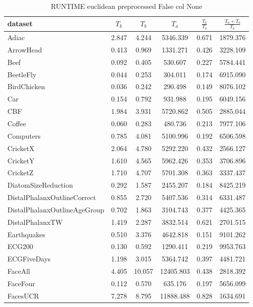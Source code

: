 \begin{table}[ht]
\caption{RUNTIME euclidean preprocessed False col None} 
\begin{adjustbox}{width=0.7\textwidth,center}
\begin{tabular}{lccccc}
\hline
dataset & $T_k$ & $T_b$ & $T_a$ & $\frac{T_k}{T_b}$ & $\frac{T_a + T_b}{T_k}$ \\ \hline
Adiac & 2.847 & 4.244 & 5346.339 & 0.671 & 1879.376 \\
ArrowHead & 0.413 & 0.969 & 1331.271 & 0.426 & 3228.109 \\
Beef & 0.092 & 0.405 & 530.607 & 0.227 & 5784.441 \\
BeetleFly & 0.044 & 0.253 & 304.011 & 0.174 & 6915.090 \\
BirdChicken & 0.036 & 0.242 & 290.498 & 0.149 & 8076.102 \\
Car & 0.154 & 0.792 & 931.988 & 0.195 & 6049.156 \\
CBF & 1.984 & 3.931 & 5720.862 & 0.505 & 2885.044 \\
Coffee & 0.060 & 0.283 & 480.736 & 0.213 & 7977.106 \\
Computers & 0.785 & 4.081 & 5100.996 & 0.192 & 6506.598 \\
CricketX & 2.064 & 4.780 & 5292.220 & 0.432 & 2566.127 \\
CricketY & 1.610 & 4.565 & 5962.426 & 0.353 & 3706.896 \\
CricketZ & 1.710 & 4.707 & 5701.308 & 0.363 & 3337.437 \\
DiatomSizeReduction & 0.292 & 1.587 & 2455.207 & 0.184 & 8425.219 \\
DistalPhalanxOutlineCorrect & 0.855 & 2.720 & 5407.536 & 0.314 & 6331.487 \\
DistalPhalanxOutlineAgeGroup & 0.702 & 1.863 & 3104.743 & 0.377 & 4425.365 \\
DistalPhalanxTW & 1.419 & 2.287 & 3832.514 & 0.621 & 2701.515 \\
Earthquakes & 0.510 & 3.376 & 4642.818 & 0.151 & 9101.262 \\
ECG200 & 0.130 & 0.592 & 1290.411 & 0.219 & 9953.763 \\
ECGFiveDays & 1.198 & 3.015 & 5364.742 & 0.397 & 4481.721 \\
FaceAll & 4.405 & 10.057 & 12405.803 & 0.438 & 2818.392 \\
FaceFour & 0.112 & 0.570 & 635.176 & 0.197 & 5656.099 \\
FacesUCR & 7.278 & 8.795 & 11888.488 & 0.828 & 1634.691 \\

\end{tabular}
\end{adjustbox}
\end{table}

